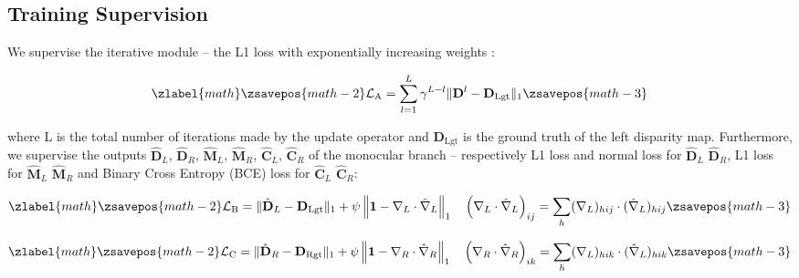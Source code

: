 \documentclass[10pt,twocolumn,letterpaper]{article}
\begin{document}
\phantom{Invisible Text}
\vspace{-\baselineskip}

\subsection{Training Supervision}

\label{subsec:training}

We supervise the iterative module  -- the L1 loss with exponentially increasing weights \cite{lipson2021raft}:

\small

\begin{equation}
\zlabel{math}
    \zsavepos{math-2}
    \mathcal{L}_\text{A} = \sum_{l=1}^L{\gamma^{L-l}\lVert \mathbf{D}^l-\mathbf{D}_\text{Lgt} \rVert_1}
    \label{eq:loss_raft}
    \zsavepos{math-3}\end{equation}

\normalsize
where L is the total number of iterations made by the update operator and $\mathbf{D}_\text{Lgt}$ is the ground truth of the left disparity map.
Furthermore, we supervise the outputs $\hat{\mathbf{D}}_L$, $\hat{\mathbf{D}}_R$, $\hat{\mathbf{M}}_L$, $\hat{\mathbf{M}}_R$, $\hat{\mathbf{C}}_L$, $\hat{\mathbf{C}}_R$ of the monocular branch -- respectively L1 loss and normal loss for $\hat{\mathbf{D}}_L$ $\hat{\mathbf{D}}_R$, L1 loss for $\hat{\mathbf{M}}_L$ $\hat{\mathbf{M}}_R$ and Binary Cross Entropy (BCE) loss for $\hat{\mathbf{C}}_L$ $\hat{\mathbf{C}}_R$:

\small

\begin{equation}
\zlabel{math}
    \zsavepos{math-2}
    \mathcal{L}_\text{B} = \lVert \hat{\mathbf{D}}_L - \mathbf{D}_\text{Lgt} \rVert_1 + \psi \left\lVert \mathbf{1} - \nabla_L\cdot\hat{\nabla}_L \right\rVert_1 \quad \left( \nabla_L\cdot\hat{\nabla}_L \right)_{ij} = \sum_h (\nabla_L)_{hij} \cdot (\hat{\nabla}_L)_{hij}
    \label{eq:loss_coarse_disp_left}
    \zsavepos{math-3}\end{equation}

\normalsize
\small

\begin{equation}
\zlabel{math}
    \zsavepos{math-2}
    \mathcal{L}_\text{C} = \lVert \hat{\mathbf{D}}_R - \mathbf{D}_\text{Rgt} \rVert_1 + \psi \left\lVert \mathbf{1} - \nabla_R\cdot\hat{\nabla}_R \right\rVert_1 \quad \left( \nabla_R\cdot\hat{\nabla}_R \right)_{ik} = \sum_h (\nabla_L)_{hik} \cdot (\hat{\nabla}_L)_{hik}
    \label{eq:loss_coarse_disp_right}
    \zsavepos{math-3}\end{equation}
\end{document}
